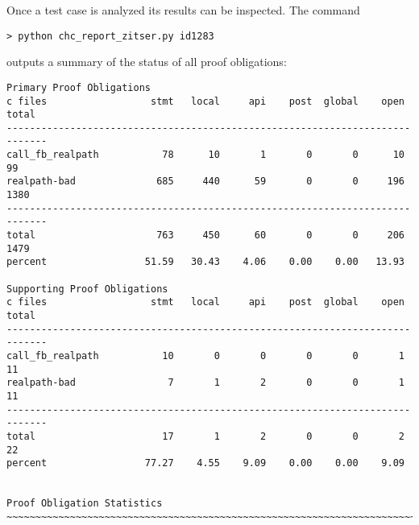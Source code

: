 \documentclass[11pt]{article}
\begin{document}
Once a test case is analyzed its results can be inspected. The command
\begin{verbatim}
> python chc_report_zitser.py id1283
\end{verbatim}
outputs a summary of the status of all proof obligations:
\begin{small}
\begin{verbatim}
Primary Proof Obligations
c files                  stmt   local     api    post  global    open   total
-----------------------------------------------------------------------------
call_fb_realpath           78      10       1       0       0      10      99
realpath-bad              685     440      59       0       0     196    1380
-----------------------------------------------------------------------------
total                     763     450      60       0       0     206    1479
percent                 51.59   30.43    4.06    0.00    0.00   13.93

Supporting Proof Obligations
c files                  stmt   local     api    post  global    open   total
-----------------------------------------------------------------------------
call_fb_realpath           10       0       0       0       0       1      11
realpath-bad                7       1       2       0       0       1      11
-----------------------------------------------------------------------------
total                      17       1       2       0       0       2      22
percent                 77.27    4.55    9.09    0.00    0.00    9.09


Proof Obligation Statistics
~~~~~~~~~~~~~~~~~~~~~~~~~~~~~~~~~~~~~~~~~~~~~~~~~~~~~~~~~~~~~~~~~~~~~~~~~~~~~~~~


\end{verbatim}
\end{small}
\end{document}
